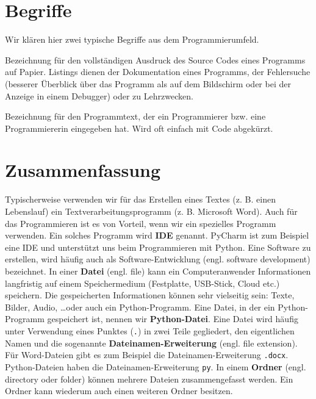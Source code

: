 
\section{Begriffe}

Wir klären hier zwei typische Begriffe aus dem Programmierumfeld.

\begin{definition}
Bezeichnung für den vollständigen Ausdruck des Source Codes eines Programms auf Papier.
Listings dienen der Dokumentation eines Programms, der Fehlersuche (besserer Überblick über das Programm als auf dem Bildschirm oder bei der Anzeige in einem Debugger) oder zu Lehrzwecken. \cite{def-listing}
\end{definition}

\begin{definition}
Bezeichnung für den Programmtext, der ein Programmierer bzw. eine Programmiererin eingegeben hat.
Wird oft einfach mit Code abgekürzt.
\end{definition}

\section{Zusammenfassung}

Typischerweise verwenden wir für das Erstellen eines Textes (z. B. einen Lebenslauf) ein Textverarbeitungsprogramm (z. B. Microsoft Word).
Auch für das Programmieren ist es von Vorteil, wenn wir ein spezielles Programm verwenden.
Ein solches Programm wird \textbf{\ac{IDE}} genannt.
PyCharm ist zum Beispiel eine \ac{IDE} und unterstützt uns beim Programmieren mit Python.
Eine Software zu erstellen, wird häufig auch als Software-Entwicklung (engl. software development) bezeichnet.
In einer \textbf{Datei} (engl. file) kann ein Computeranwender Informationen langfristig auf einem Speichermedium (Festplatte, \ac{USB}-Stick, Cloud etc.) speichern.
Die gespeicherten Informationen können sehr vielseitig sein: Texte, Bilder, Audio, \dots oder auch ein Python-Programm.
Eine Datei, in der ein Python-Programm gespeichert ist, nennen wir \textbf{Python-Datei}.
Eine Datei wird häufig unter Verwendung eines Punktes (\texttt{.}) in zwei Teile gegliedert, den eigentlichen Namen und die sogenannte \textbf{Dateinamen-Erweiterung} (engl. file extension).
Für Word-Dateien gibt es zum Beispiel die Dateinamen-Erweiterung \texttt{.docx}.
Python-Dateien haben die Dateinamen-Erweiterung \texttt{py}. In einem \textbf{Ordner} (engl. directory oder folder) können mehrere Dateien zusammengefasst werden.
Ein Ordner kann wiederum auch einen weiteren Ordner besitzen.